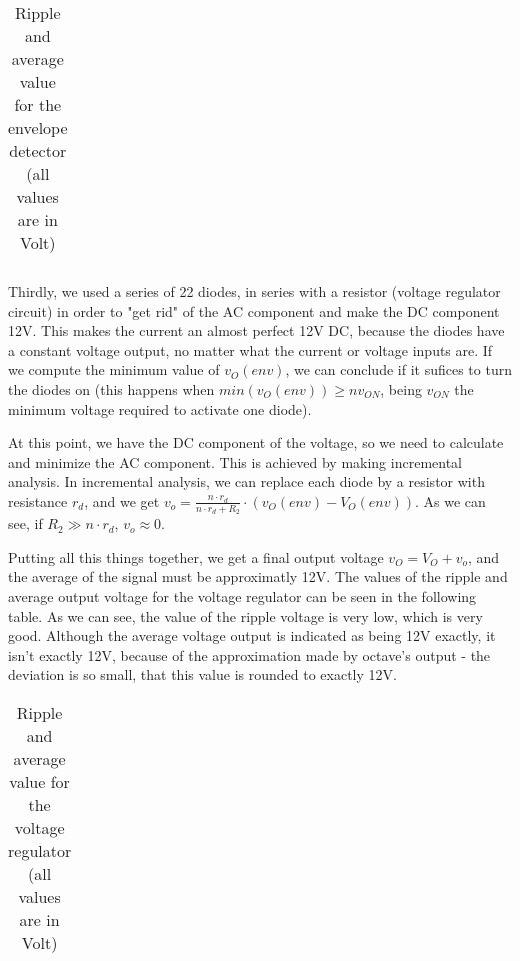 \vspace{5mm}
\begin{table}[h!]
\centering
\begin{tabularx}{0.9\textwidth} {
  | >{\raggedright\arraybackslash}X
  | >{\raggedleft\arraybackslash}X | }
 \hline

\end{tabularx}
\caption{\label{tab:Table 1} Ripple and average value for the envelope detector (all values are in Volt)}
\end{table}
\vspace{5mm}

\par Thirdly, we used a series of 22 diodes, in series with a resistor (voltage regulator circuit) in order to "get rid" of the AC component and make the DC component 12V. This makes the current an almost perfect 12V DC, because the diodes have a constant voltage output, no matter what the current or voltage inputs are. If we compute the minimum value of $v_O(env)$, we can conclude if it sufices to turn the diodes on (this happens when $min(v_O(env)) \geq nv_{ON}$, being $v_{ON}$ the minimum voltage required to activate one diode).
\par At this point, we have the DC component of the voltage, so we need to calculate and minimize the AC component. This is achieved by making incremental analysis. In incremental analysis, we can replace each diode by a resistor with resistance $r_d$, and we get $v_o = \frac{n \cdot r_d}{n \cdot r_d+R_2} \cdot (v_O(env)-V_O(env))$. As we can see, if $R_2 \gg n \cdot r_d$, $v_o \approx 0$.
\par Putting all this things together, we get a final output voltage $v_O=V_O+v_o$, and the average of the signal must be approximatly 12V. The values of the ripple and average output voltage for the voltage regulator can be seen in the following table. As we can see, the value of the ripple voltage is very low, which is very good. Although the average voltage output is indicated as being 12V exactly, it isn't exactly 12V, because of the approximation made by octave's output - the deviation is so small, that this value is rounded to exactly 12V.

\vspace{5mm}
\begin{table}[h!]
\centering
\begin{tabularx}{0.9\textwidth} {
  | >{\raggedright\arraybackslash}X
  | >{\raggedleft\arraybackslash}X | }
 \hline

\end{tabularx}
\caption{\label{tab:Table 2} Ripple and average value for the voltage regulator (all values are in Volt)}
\end{table}
\vspace{5mm}

